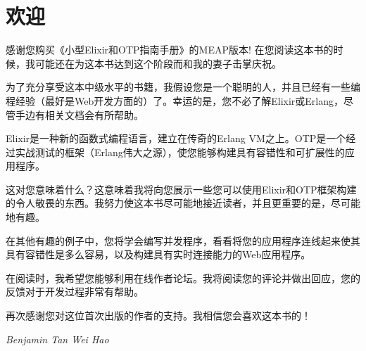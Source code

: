 \chapter*{欢迎}\label{welcome}

感谢您购买《小型Elixir和OTP指南手册》的MEAP版本! 在您阅读这本书的时候，我可能还在为这本书达到这个阶段而和我的妻子击掌庆祝。

为了充分享受这本中级水平的书籍，我假设您是一个聪明的人，并且已经有一些编程经验（最好是Web开发方面的）了。幸运的是，您不必了解Elixir或Erlang，尽管手边有相关文档会有所帮助。

Elixir是一种新的函数式编程语言，建立在传奇的Erlang VM之上。OTP是一个经过实战测试的框架（Erlang伟大之源），使您能够构建具有容错性和可扩展性的应用程序。

这对您意味着什么？这意味着我将向您展示一些您可以使用Elixir和OTP框架构建的令人敬畏的东西。我努力使这本书尽可能地接近读者，并且更重要的是，尽可能地有趣。

在其他有趣的例子中，您将学会编写并发程序，看看将您的应用程序连线起来使其具有容错性是多么容易，以及构建具有实时连接能力的Web应用程序。

在阅读时，我希望您能够利用在线作者论坛。我将阅读您的评论并做出回应，您的反馈对于开发过程非常有帮助。

再次感谢您对这位首次出版的作者的支持。我相信您会喜欢这本书的！

\vspace{2cm} 

\hspace{0.5\textwidth}\textit{Benjamin Tan Wei Hao}

